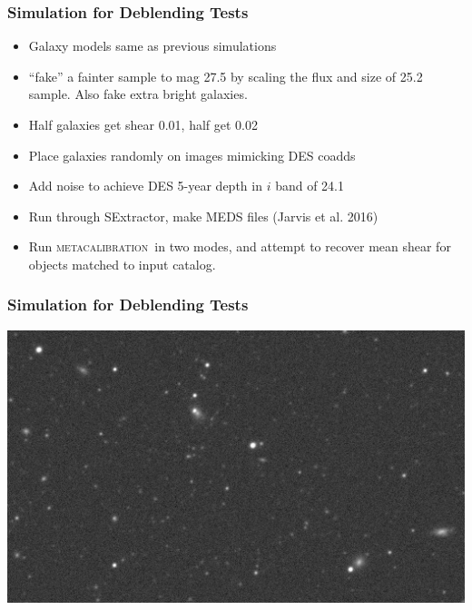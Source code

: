 \documentclass{beamer}
\newcommand{\mcal}{\textsc{metacalibration}}
\begin{document}
\frame
{

    \frametitle{Simulation for Deblending Tests}


    \begin{itemize}
        \item Galaxy models same as previous simulations
        \item ``fake'' a fainter sample to mag 27.5 by scaling
            the flux and size of 25.2 sample.  Also fake extra bright galaxies.
        \item Half galaxies get shear 0.01, half get 0.02
        \item Place galaxies randomly on images mimicking DES coadds
        \item Add noise to achieve DES 5-year depth in $i$ band of 24.1
        \item Run through SExtractor, make MEDS files (Jarvis et al. 2016)

        \item Run \mcal\ in two modes, and attempt to recover mean
            shear for objects matched to input catalog.

    \end{itemize}


}

\frame
{
    \frametitle{Simulation for Deblending Tests }
 
    \begin{center}
        \includegraphics[width=\columnwidth]{nbrsim-003f-009969-image-crop.jpg}
    \end{center}

}
\end{document}

